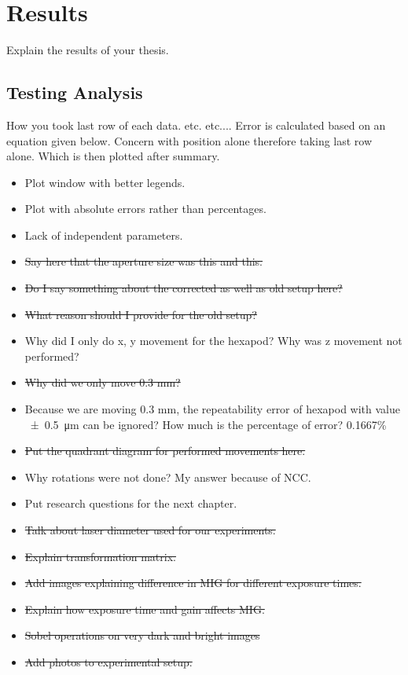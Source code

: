 \chapter{Results} \label{Chap:Results}

Explain the results of your thesis.

\section{Testing Analysis}
How you took last row of each data. etc. etc.... Error is calculated based on an equation given below. Concern with position alone therefore taking last row alone. Which is then plotted after summary.

\begin{itemize}
    \item Plot window with better legends.
    \item Plot with absolute errors rather than percentages.
    \item Lack of independent parameters.
    \item \sout{Say here that the aperture size was this and this.}
    \item \sout{Do I say something about the corrected as well as old setup here?}
    \item \sout{What reason should I provide for the old setup?}
    \item Why did I only do x, y movement for the hexapod? Why was z movement not performed?
    \item \sout{Why did we only move 0.3 mm?}
    \item Because we are moving 0.3 mm, the repeatability error of hexapod with value \SI{\pm0.5}{\micro\meter} can be ignored? How much is the percentage of error? 0.1667\%
    \item \sout{Put the quadrant diagram for performed movements here.}
    \item Why rotations were not done? My answer because of NCC.
    \item Put research questions for the next chapter.
    \item \sout{Talk about laser diameter used for our experiments.}
    \item \sout{Explain transformation matrix.}
    \item \sout{Add images explaining difference in MIG for different exposure times.}
    \item \sout{Explain how exposure time and gain affects MIG.}
    \item \sout{Sobel operations on very dark and bright images}
    \item \sout{Add photos to experimental setup.}
\end{itemize}